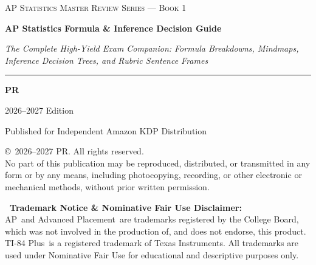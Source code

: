 \documentclass[11pt,oneside,openany]{book}
\newcommand{\BookTitle}{AP Statistics Formula \& Inference Decision Guide}
\newcommand{\BookSubtitle}{The Complete High-Yield Exam Companion: Formula Breakdowns, Mindmaps, Inference Decision Trees, and Rubric Sentence Frames}
\newcommand{\BookSeries}{AP Statistics Master Review Series --- Book 1}
\newcommand{\BookAuthor}{PR}
\newcommand{\Edition}{2026--2027 Edition}
\begin{document}
\frontmatter

\begin{titlepage}
\centering
\vspace*{0.5in}

{\Large\scshape \BookSeries}\par
\vspace{0.8cm}

{\Huge\bfseries\color{MidnightBlue} \BookTitle}\par
\vspace{0.4cm}
{\large\itshape \BookSubtitle}\par

\vspace{1.2cm}

\rule{0.6\textwidth}{1.0pt}\par
\vspace{1.0cm}

{\Large\bfseries \BookAuthor}\par
\vspace{0.25cm}
{\large \Edition}\par

\vfill

{\small Published for Independent Amazon KDP Distribution}\par
\vspace*{0.3in}
\end{titlepage}

\newpage
\thispagestyle{empty}
\vspace*{1.5in}

\noindent \copyright\ 2026--2027 \BookAuthor. All rights reserved.\\
No part of this publication may be reproduced, distributed, or transmitted in any form or by any means, including photocopying, recording, or other electronic or mechanical methods, without prior written permission.

\vspace{0.2in}

\noindent \textbf{\textregistered\ Trademark Notice \& Nominative Fair Use Disclaimer:}\\
\small{AP\textregistered\ and Advanced Placement\textregistered\ are trademarks registered by the College Board, which was not involved in the production of, and does not endorse, this product. TI-84 Plus\textregistered\ is a registered trademark of Texas Instruments. All trademarks are used under Nominative Fair Use for educational and descriptive purposes only.}
\end{document}
